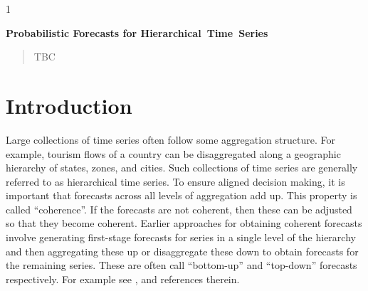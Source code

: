 \documentclass[12pt]{article}
\newcommand{\blind}{1}
\theoremstyle{definition}
\begin{document}
	\blind
	{
		\bigskip
		\bigskip
		\bigskip
		\begin{center}
			{\LARGE\bf Probabilistic Forecasts for Hierarchical~Time~Series}
		\end{center}
		\medskip
	} \fi
	
	\bigskip


\begin{abstract}
	TBC
\end{abstract}


\newpage
{} %

\section{Introduction}\label{sec:intro_chap3}

Large collections of time series often follow some aggregation structure. For example, tourism flows of a country can be disaggregated along a geographic hierarchy of states, zones, and cities. Such collections of time series are generally referred to as hierarchical time series. To ensure aligned decision making, it is important that forecasts across all levels of aggregation add up. This property is called ``coherence''. If the forecasts are not coherent, then these can be adjusted so that they become coherent. Earlier approaches for obtaining coherent forecasts involve generating first-stage forecasts for series in a single level of the hierarchy and then aggregating these up or disaggregate these down to obtain forecasts for the remaining series. These are often call ``bottom-up'' and ``top-down'' forecasts respectively. For example see \citet{Dunn1976}, \citet{Gross1990} and references therein.
\end{document}

